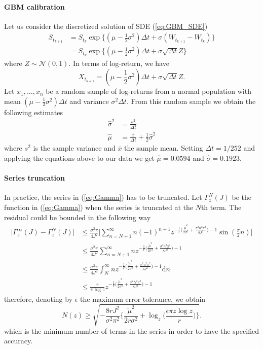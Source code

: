 \paragraph{\gls{GBM} calibration}
Let us consider the discretized solution of \gls{SDE} (\ref{eq:GBM_SDE})
\begin{align*}
S_{t_{k+1}} & = S_{t_k}\exp\big\{(\mu-\frac{1}{2}\sigma^2)\Delta t+\sigma(W_{t_{k+1}}-W_{t_k})\big\} \\
& = S_{t_k}\exp\big\{(\mu-\frac{1}{2}\sigma^2)\Delta t+\sigma\sqrt{\Delta t}Z\big\}
\end{align*}
where $Z \sim \mathcal{N}(0,1)$. In terms of log-return, we have
\[X_{t_{k+1}} = (\mu-\frac{1}{2}\sigma^2)\Delta t+\sigma\sqrt{\Delta t}Z.\] 
Let $x_1,\ldots,x_n$ be a random sample of log-returns from a normal population with mean $(\mu-\frac{1}{2}\sigma^2)\Delta t$ and variance $\sigma^2 \Delta t$. From this random sample we obtain the following estimates
\begin{align*}
\widehat{\sigma}^2 & = \frac{s^2}{\Delta t}\\[1.5ex]
\widehat{\mu} & = \frac{\bar{x}}{\Delta t} + \frac{1}{2}\widehat{\sigma}^2
\end{align*}
where $s^2$ is the sample variance and $\bar{x}$ the sample mean. Setting $\Delta t = 1/252$ and applying the equations above to our data we get $\widehat{\mu} = 0.0594$ and $\widehat{\sigma} = 0.1923$.


\paragraph{Series truncation}
In practice, the series in (\ref{eq:Gamma}) has to be truncated. Let $\Gamma^N_z(J)$ be the function in (\ref{eq:Gamma}) when the series is truncated at the $N$th term. The residual could be bounded in the following way
\begin{align*}
\big\lvert\Gamma^{\infty}_z(J)-\Gamma^N_z(J)\big\lvert & \leq \frac{\sigma^2\pi}{4J^2}\bigg\lvert\sum_{n=N+1}^{\infty}n(-1)^{n+1}z^{-\frac{1}{r}\big(\frac{\tilde{\mu}^2}{2\sigma^2} + \frac{\sigma^2n^2\pi^2}{8J^2}\big)-1}\sin(\frac{\pi}{2}n)\bigg\lvert\\
& \leq \frac{\sigma^2\pi}{4J^2} \sum_{n=N+1}^{\infty}nz^{-\frac{1}{r}\big(\frac{\tilde{\mu}^2}{2\sigma^2} + \frac{\sigma^2n^2\pi^2}{8J^2}\big)-1}\\
& \leq \frac{\sigma^2\pi}{4J^2} \int_{N}^{\infty}nz^{-\frac{1}{r}\big(\frac{\tilde{\mu}^2}{2\sigma^2} + \frac{\sigma^2n^2\pi^2}{8J^2}\big)-1}\mathrm{d}n\\
& \leq \frac{r}{\pi \log z}z^{-\frac{1}{r}\big(\frac{\tilde{\mu}^2}{2\sigma^2} + \frac{\sigma^2N^2\pi^2}{8J^2}\big)-1}
\end{align*}
therefore, denoting by $\epsilon$ the maximum error tolerance, we obtain
\begin{equation}
N(z) \geq \sqrt{-\frac{8rJ^2}{\sigma^2\pi^2}\bigg\{\frac{\widetilde{\mu}^2}{2r\sigma^2}+\log_z\Big(\frac{\epsilon\pi z \log z}{r}\Big) \bigg\}}.
\end{equation}
which is the minimum number of terms in the series in order to have the specified accuracy.


